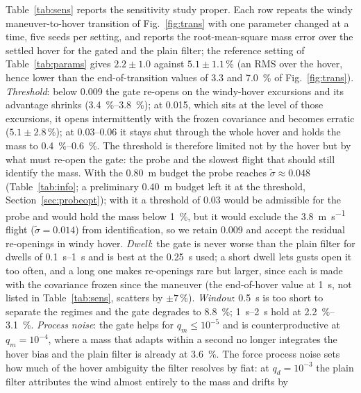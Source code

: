 \documentclass{ieeeaccess}
\begin{document}
Table~\ref{tab:sens} reports the sensitivity study proper. Each row repeats
the windy maneuver-to-hover transition of Fig.~\ref{fig:trans} with one
parameter changed at a time, five seeds per setting, and reports the
root-mean-square mass error over the settled hover for the gated and the plain
filter; the reference setting of Table~\ref{tab:params} gives $2.2\pm1.0$
against $5.1\pm1.1$\,\si{\percent} (an RMS over the hover, hence lower than the
end-of-transition values of \SI{3.3}{} and \SI{7.0}{\percent} of
Fig.~\ref{fig:trans}). \emph{Threshold}: below \num{0.009} the
gate re-opens on the windy-hover excursions and its advantage shrinks
(\SIrange{3.4}{3.8}{\percent}); at \num{0.015}, which sits at the level of those
excursions, it opens intermittently with the frozen covariance and becomes
erratic ($5.1\pm2.8$\,\si{\percent}); at \numrange{0.03}{0.06} it stays shut
through the whole hover and holds the mass to \SIrange{0.4}{0.6}{\percent}. The
threshold is therefore limited not by the hover but by what must re-open the
gate: the probe and the slowest flight that should still identify the mass. With the
\SI{0.80}{\meter} budget the probe reaches $\tilde\sigma\approx0.048$
(Table~\ref{tab:info}; a preliminary \SI{0.40}{\meter} budget left it at
the threshold, Section~\ref{sec:probeopt}); with it a threshold of \num{0.03} would be admissible for the probe and would hold
the mass below \SI{1}{\percent}, but it would exclude the
\SI{3.8}{\meter\per\second} flight ($\tilde\sigma=0.014$) from identification, so
we retain \num{0.009} and accept the residual re-openings in windy hover.
\emph{Dwell}: the gate is never worse than the plain filter for dwells of
\SIrange{0.1}{1}{\second} and is best at the \SI{0.25}{\second} used; a short
dwell lets gusts open it too often, and a long one makes re-openings rare but
larger, since each is made with the covariance frozen since the maneuver (the
end-of-hover value at \SI{1}{\second}, not listed in Table~\ref{tab:sens}, scatters
by $\pm7$\,\si{\percent}).
\emph{Window}: \SI{0.5}{\second} is too short to separate the regimes and the
gate degrades to \SI{8.8}{\percent}; \SIrange{1}{2}{\second} hold at
\SIrange{2.2}{3.1}{\percent}. \emph{Process noise}: the gate helps for
$q_m\le10^{-5}$ and is counterproductive at $q_m=10^{-4}$, where a mass that
adapts within a second no longer integrates the hover bias and the plain filter
is already at \SI{3.6}{\percent}. The force process noise sets how much of the
hover ambiguity the filter resolves by fiat: at $q_d=10^{-3}$ the plain filter
attributes the wind almost entirely to the mass and drifts by
\end{document}
